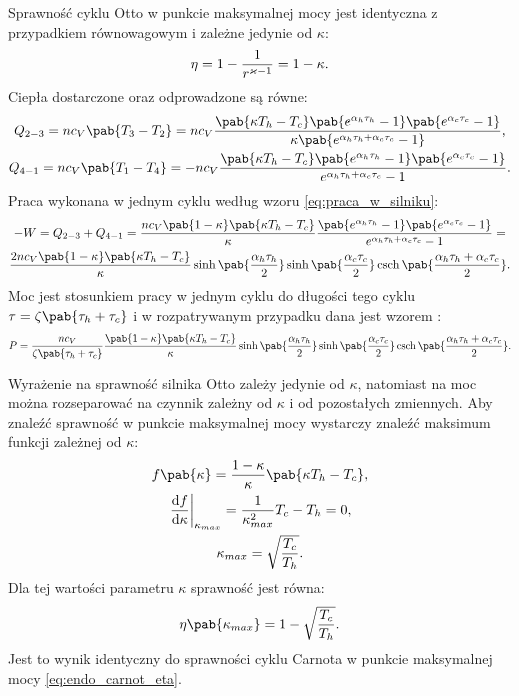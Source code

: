 Sprawność cyklu Otto w punkcie maksymalnej mocy jest identyczna z przypadkiem równowagowym i zależne jedynie od \(\kappa\):
\begin{equation}
	\eta = 1 - \frac{1}{r^{\varkappa-1}} = 1 - \kappa.
\end{equation}
Ciepła dostarczone oraz odprowadzone są równe:
\begin{gather}
	Q_{2-3} = nc_V \pab{T_3 - T_2} =
	nc_V \frac{
	\pab{\kappa T_h - T_c}
	\pab{e^{\alpha_h \tau_h} - 1}
	\pab{e^{\alpha_c \tau_c} - 1}
	}{
	\kappa\pab{e^{\alpha_h \tau_h + \alpha_c \tau_c} - 1}
	}, \\
	Q_{4-1} = nc_V \pab{T_1 - T_4} =
	- nc_V \frac{
	\pab{\kappa T_h - T_c}
	\pab{e^{\alpha_h \tau_h} - 1}
	\pab{e^{\alpha_c \tau_c} - 1}
	}{
	e^{\alpha_h \tau_h + \alpha_c \tau_c} - 1
	}.
\end{gather}
Praca wykonana w jednym cyklu według wzoru \eqref{eq:praca_w_silniku}:
\begin{multline}
	-W = Q_{2-3} + Q_{4-1} =
	\frac{nc_V\pab{1-\kappa}\pab{\kappa T_h - T_c}}{\kappa}
	\frac{
		\pab{e^{\alpha_h \tau_h} - 1}
		\pab{e^{\alpha_c \tau_c} - 1}
	}{
		e^{\alpha_h \tau_h + \alpha_c \tau_c} - 1
	} = \\
	\frac{2nc_V\pab{1-\kappa}\pab{\kappa T_h - T_c}}{\kappa}
	\sinh\pab{\frac{\alpha_h \tau_h}{2}}
	\sinh\pab{\frac{\alpha_c \tau_c}{2}}
	\csch\pab{\frac{\alpha_h \tau_h + \alpha_c \tau_c}{2}}.
\end{multline}
Moc jest stosunkiem pracy w jednym cyklu do długości tego cyklu \(\tau = \zeta\pab{\tau_h + \tau_c}\) i w rozpatrywanym przypadku dana jest wzorem \cite{endo_otto}:
\begin{equation}
	P = \frac{nc_V}{\zeta\pab{\tau_h + \tau_c}}
	\frac{\pab{1-\kappa}\pab{\kappa T_h - T_c}}{\kappa}
	\sinh\pab{\frac{\alpha_h \tau_h}{2}}
	\sinh\pab{\frac{\alpha_c \tau_c}{2}}
	\csch\pab{\frac{\alpha_h \tau_h + \alpha_c \tau_c}{2}}.
\end{equation}

Wyrażenie na sprawność silnika Otto zależy jedynie od \(\kappa\), natomiast na moc można rozseparować na czynnik zależny od \(\kappa\) i od pozostałych zmiennych. Aby znaleźć sprawność w punkcie maksymalnej mocy wystarczy znaleźć maksimum funkcji zależnej od \(\kappa\):
\begin{gather*}
	f\pab{\kappa} = \frac{1-\kappa}{\kappa}\pab{\kappa T_h - T_c}, \\
	\odv[delims-eval=.|]{f}{\kappa}_{\kappa_{max}} = \inv{\kappa_{max}^2}T_c - T_h = 0, \\
	\kappa_{max} = \sqrt{\frac{T_c}{T_h}}.
\end{gather*}
Dla tej wartości parametru \(\kappa\) sprawność jest równa:
\begin{equation}\label{eq:endo_otto_klas_eta}
	\eta\pab{\kappa_{max}} = 1 - \sqrt{\frac{T_c}{T_h}}.
\end{equation}
Jest to wynik identyczny do sprawności cyklu Carnota w punkcie maksymalnej mocy \eqref{eq:endo_carnot_eta}.

